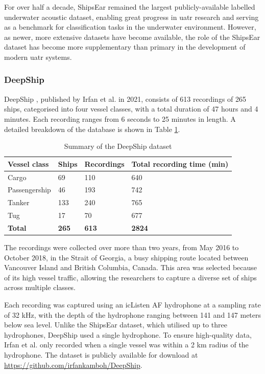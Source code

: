 For over half a decade, ShipsEar remained the largest publicly-available labelled underwater acoustic dataset, enabling great progress in \acrshort{uatr} research and serving as a benchmark for classification tasks in the underwater environment. However, as newer, more extensive datasets have become available, the role of the ShipsEar dataset has become more supplementary than primary in the development of modern \acrshort{uatr} systems.

\subsubsection{DeepShip}\label{subsubsec:deepship}

DeepShip \cite{irfan_deepship_2021}, published by Irfan et al. in 2021, consists of 613 recordings of 265 ships, categorised into four vessel classes, with a total duration of 47 hours and 4 minutes. Each recording ranges from 6 seconds to 25 minutes in length. A detailed breakdown of the database is shown in Table \ref{tab:deepship-summary}.

\begin{table}[bp]
\centering
\caption{Summary of the DeepShip dataset}
\label{tab:deepship-summary}
\begin{tabular}{llll}
\toprule
\textbf{Vessel class} & \textbf{Ships} & \textbf{Recordings} & \textbf{Total recording time (min)} \\ \midrule
Cargo           & 69  & 110   & 640 \\
Passengership   & 46  & 193   & 742 \\
Tanker          & 133 & 240   & 765 \\
Tug             & 17  & 70    & 677 \\
\textbf{Total}  & \textbf{265} & \textbf{613} & \textbf{2824} \\ \bottomrule
\end{tabular}
\end{table}

The recordings were collected over more than two years, from May 2016 to October 2018, in the Strait of Georgia, a busy shipping route located between Vancouver Island and British Columbia, Canada. This area was selected because of its high vessel traffic, allowing the researchers to capture a diverse set of ships across multiple classes.

Each recording was captured using an icListen AF hydrophone at a sampling rate of 32 kHz, with the depth of the hydrophone ranging between 141 and 147 meters below sea level. Unlike the ShipsEar dataset, which utilised up to three hydrophones, DeepShip used a single hydrophone. To ensure high-quality data, Irfan et al. only recorded when a single vessel was within a 2 km radius of the hydrophone. The dataset is publicly available for download at \url{https://github.com/irfankamboh/DeepShip}.

